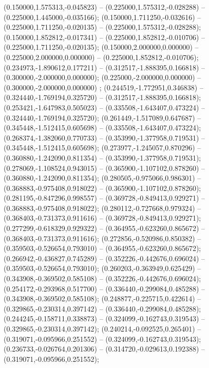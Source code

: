  (0.150000,1.575313,-0.045823) -- (0.225000,1.575312,-0.028288) -- (0.225000,1.445000,-0.035166);
 (0.150000,1.711250,-0.032616) -- (0.225000,1.711250,-0.020135) -- (0.225000,1.575312,-0.028288);
 (0.150000,1.852812,-0.017341) -- (0.225000,1.852812,-0.010706) -- (0.225000,1.711250,-0.020135);
 (0.150000,2.000000,0.000000) -- (0.225000,2.000000,0.000000) -- (0.225000,1.852812,-0.010706);
 (0.234973,-1.890612,0.177211) -- (0.312517,-1.888395,0.166818) -- (0.300000,-2.000000,0.000000);
 (0.225000,-2.000000,0.000000) -- (0.300000,-2.000000,0.000000) ;
 (0.244519,-1.772951,0.346838) -- (0.324440,-1.769194,0.325720) -- (0.312517,-1.888395,0.166818);
 (0.253421,-1.647983,0.505023) -- (0.335508,-1.643407,0.473224) -- (0.324440,-1.769194,0.325720);
 (0.261449,-1.517089,0.647687) -- (0.345448,-1.512415,0.605698) -- (0.335508,-1.643407,0.473224);
 (0.268374,-1.382060,0.770733) -- (0.353990,-1.377958,0.719531) -- (0.345448,-1.512415,0.605698);
 (0.273977,-1.245057,0.870296) -- (0.360880,-1.242090,0.811354) -- (0.353990,-1.377958,0.719531);
 (0.278069,-1.108524,0.943015) -- (0.365900,-1.107102,0.878260) -- (0.360880,-1.242090,0.811354);
 (0.280505,-0.975066,0.986301) -- (0.368883,-0.975408,0.918022) -- (0.365900,-1.107102,0.878260);
 (0.281195,-0.847296,0.998557) -- (0.369728,-0.849413,0.929271) -- (0.368883,-0.975408,0.918022);
 (0.280112,-0.727668,0.979324) -- (0.368403,-0.731373,0.911616) -- (0.369728,-0.849413,0.929271);
 (0.277299,-0.618329,0.929322) -- (0.364955,-0.623260,0.865672) -- (0.368403,-0.731373,0.911616);
 (0.272856,-0.520986,0.850382) -- (0.359503,-0.526654,0.793010) -- (0.364955,-0.623260,0.865672);
 (0.266942,-0.436827,0.745289) -- (0.352226,-0.442676,0.696024) -- (0.359503,-0.526654,0.793010);
 (0.260203,-0.363949,0.625429) -- (0.343908,-0.369502,0.585108) -- (0.352226,-0.442676,0.696024);
 (0.254172,-0.293968,0.517700) -- (0.336440,-0.299084,0.485288) -- (0.343908,-0.369502,0.585108);
 (0.248877,-0.225715,0.422614) -- (0.329865,-0.230314,0.397142) -- (0.336440,-0.299084,0.485288);
 (0.244245,-0.158711,0.338873) -- (0.324099,-0.162743,0.319543) -- (0.329865,-0.230314,0.397142);
 (0.240214,-0.092525,0.265401) -- (0.319071,-0.095966,0.251552) -- (0.324099,-0.162743,0.319543);
 (0.236733,-0.026764,0.201306) -- (0.314720,-0.029613,0.192388) -- (0.319071,-0.095966,0.251552);
